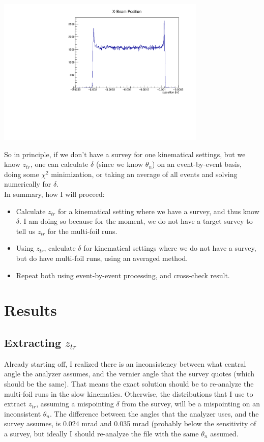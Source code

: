 \documentclass{article}
\begin{document}
\begin{center}
\includegraphics[width=10cm]{beamPos.pdf}\\
\end{center}


So in principle, if we don't have a survey for one kinematical settings, but we know $z_{tr}$, one can calculate $\delta$ (since we know $\theta_n$) on an event-by-event basis, doing some $\chi^2$ minimization, or taking an average of all events and solving numerically for $\delta$. \\

In summary, how I will proceed:
\begin{itemize}
\item{Calculate $z_{tr}$ for a kinematical setting where we have a survey, and thus know $\delta$. I am doing so because for the moment, we do not have a target survey to tell us $z_{tr}$ for the multi-foil runs.}
\item{Using $z_{tr}$, calculate $\delta$ for kinematical settings where we do not have a survey, but do have multi-foil runs, using an averaged method.}
\item{Repeat both using event-by-event processing, and cross-check result.}
\end{itemize}

\clearpage

\section*{Results}
\subsection*{Extracting $z_{tr}$}
Already starting off, I realized there is an inconsistency between what central angle the analyzer assumes, and the vernier angle that the survey quotes (which should be the same). That means the exact solution should be to re-analyze the multi-foil runs in the slow kinematics. Otherwise, the distributions that I use to extract $z_{tr}$, assuming a mispointing $\delta$ from the survey, will be a mispointing on an inconsistent $\theta_n$. The difference between the angles that the analyzer uses, and the survey assumes, is 0.024 mrad and 0.035 mrad (probably below the sensitivity of a survey, but ideally I should re-analyze the file with the same $\theta_n$ assumed.
\end{document}
